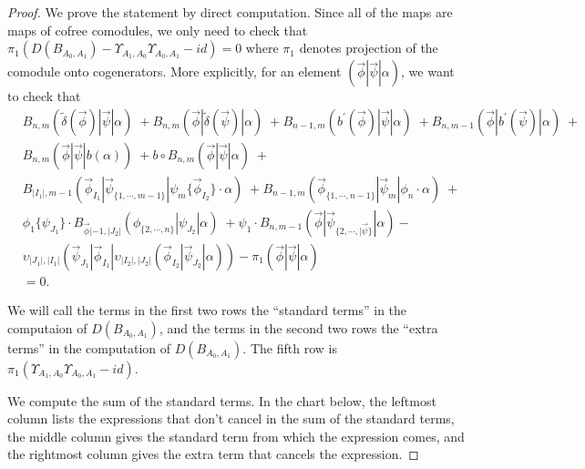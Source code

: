 \begin{proof}
We prove the statement by direct computation. 
Since all of the maps are maps of cofree comodules, 
we only need to check that $\pi_1(D(B_{A_0,A_1}) - 
\Upsilon_{A_1,A_0}\Upsilon_{A_0,A_1} - id) = 0$ 
where $\pi_1$ denotes projection of the comodule 
onto cogenerators. More explicitly, for an element 
$(\vec{\phi}|\vec{\psi}|\alpha)$, we want to check that
\begin{equation} \label{eq:upsilon_homotopy}
\begin{aligned}
&B_{n, m} ( \tilde{\delta}(\vec{\phi}) | \vec{\psi} | \alpha ) \; + 
B_{n, m} ( \vec{\phi} | \tilde{\delta}(\vec{\psi}) | \alpha ) \; + 
B_{n-1, m} ( b^\prime(\vec{\phi}) | \vec{\psi} | \alpha ) \; + 
B_{n, m-1} ( \vec{\phi} | b^\prime(\vec{\psi}) | \alpha ) \; + \\
&B_{n, m} ( \vec{\phi} | \vec{\psi} | b(\alpha) ) \; + 
b \circ B_{n, m} ( \vec{\phi} | \vec{\psi} | \alpha ) \; + \\
&B_{|I_1|, m-1}(\vec{\phi}_{I_1} | \vec{\psi}_{\{1,\cdots, m-1\}} | \psi_{m} \{\vec{\phi}_{I_2}\}\cdot \alpha ) \; + 
B_{n-1, m}(\vec{\phi}_{\{1,\cdots, n-1\}} |\vec{\psi}_{m} | \phi_{n} \cdot \alpha) \; + \\
&\phi_1 \{ \psi_{J_1}\} \cdot B_{\vec{\phi}|-1, |J_2|}(\phi_{\{2,\cdots , n\}} | \psi_{J_2} | \alpha ) \; + 
\psi_1 \cdot B_{n,m-1} ( \vec{\phi} | \vec{\psi}_{\{2,\cdots, |\vec{\psi}\}} | \alpha)  - \\ 
&\upsilon_{|J_1|, |I_1|} (\vec{\psi}_{J_1} | \vec{\phi}_{I_1} | \upsilon_{|I_2|, |J_2|} (\vec{\phi}_{I_2} | \vec{\psi}_{J_2} | \alpha ))  - \pi_1(\vec{\phi} | \vec{\psi} | \alpha) \\
&= 0.
\end{aligned}
\end{equation}

We will call the terms in the first two rows the ``standard terms'' in the computaion of $D(B_{A_0,A_1})$, and the terms in the second two rows the ``extra terms'' in the computation of $D(B_{A_0,A_1})$. The fifth row is $\pi_1(\Upsilon_{A_1,A_0}\Upsilon_{A_0,A_1} - id)$. 

We compute the sum of the standard terms. In the chart below, the leftmost column lists the expressions that don't cancel in the sum of the standard terms, the middle column gives the standard term from which the expression comes, and the rightmost column gives the extra term that cancels the expression. 

\newpage


\end{proof}
